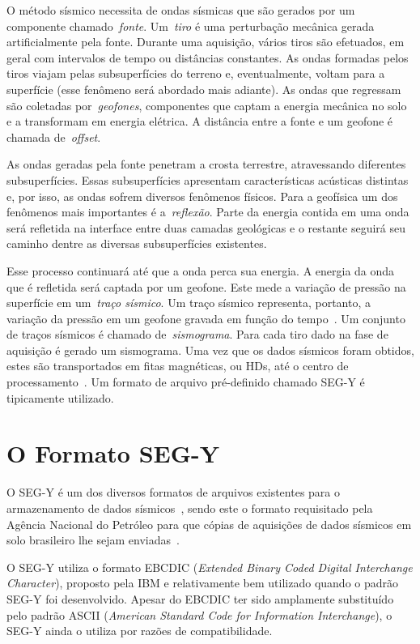 O método sísmico necessita de ondas sísmicas que são gerados por um componente
chamado~\emph{fonte}. Um~\emph{tiro} é uma perturbação mecânica gerada
artificialmente pela fonte. Durante uma aquisição, vários tiros são efetuados,
em geral com intervalos de tempo ou distâncias constantes. As ondas formadas
pelos tiros viajam pelas subsuperfícies do terreno e, eventualmente, voltam para
a superfície (esse fenômeno será abordado mais adiante). As ondas que regressam
são coletadas por~\emph{geofones}, componentes que captam a energia mecânica no
solo e a transformam em energia elétrica. A distância entre a fonte e um geofone
é chamada de~\emph{offset}.

As ondas geradas pela fonte penetram a crosta terrestre, atravessando diferentes
subsuperfícies. Essas subsuperfícies apresentam características acústicas
distintas e, por isso, as ondas sofrem diversos fenômenos físicos. Para a
geofísica um dos fenômenos mais importantes é a~\emph{reflexão}. Parte da
energia contida em uma onda será refletida na interface entre duas camadas
geológicas e o restante seguirá seu caminho dentre as diversas subsuperfícies
existentes.

Esse processo continuará até que a onda perca sua energia. A energia da onda que
é refletida será captada por um geofone. Este mede a variação de
pressão na superfície em um~\emph{traço sísmico}. Um traço sísmico representa,
portanto, a variação da pressão em um geofone gravada em função do
tempo~\citep{Livro:matlab}. Um conjunto de traços sísmicos é chamado
de~\emph{sismograma}. Para cada tiro dado na fase de aquisição é gerado um
sismograma. Uma vez que os dados sísmicos foram obtidos, estes são transportados
em fitas magnéticas, ou HDs, até o centro de
processamento~\citep{Livro:yilmaz_vol_i}. Um formato de arquivo pré-definido
chamado SEG-Y é tipicamente utilizado. 

\section{O Formato SEG-Y}
\label{subsec:segy}

O SEG-Y é um dos diversos formatos de arquivos existentes para o armazenamento
de dados sísmicos~\citep{Manual:segy}, sendo este o formato requisitado pela
Agência Nacional do Petróleo para que cópias de aquisições de dados sísmicos em
solo brasileiro lhe sejam enviadas~\citep{Manual:anp}.

O SEG-Y utiliza o formato EBCDIC (\emph{Extended Binary Coded Digital
Interchange Character}), proposto pela IBM e relativamente bem utilizado quando
o padrão SEG-Y foi desenvolvido. Apesar do EBCDIC ter sido amplamente
substituído pelo padrão ASCII (\emph{American Standard Code for Information
Interchange}), o SEG-Y ainda o utiliza por razões de compatibilidade.

